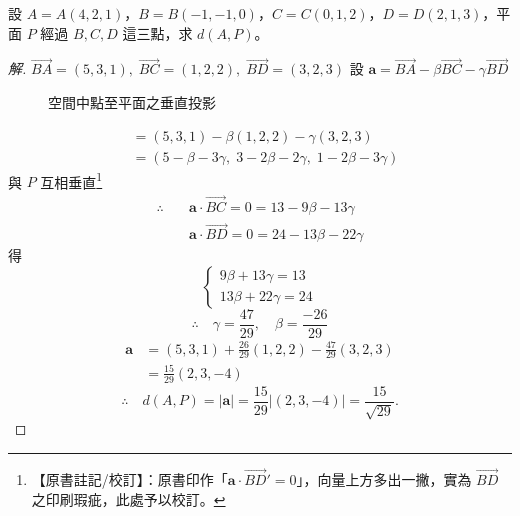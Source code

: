 \begin{example}[例 3]
設 $A = A(4, 2, 1)$，$B = B(-1, -1, 0)$，$C = C(0, 1, 2)$，$D = D(2, 1, 3)$，平面 $P$ 經過 $B, C, D$ 這三點，求 $d(A, P)$。
\end{example}
\begin{proof}[解]
$\vec{BA} = (5, 3, 1),\; \vec{BC} = (1, 2, 2),\; \vec{BD} = (3, 2, 3)$
設 $\mathbf{a} = \vec{BA} - \beta \vec{BC} - \gamma \vec{BD}$

\begin{figure}[H]
\centering
{}
\caption{空間中點至平面之垂直投影}
\label{fig:5-10}
\end{figure}

\begin{align*}
&= (5, 3, 1) - \beta(1, 2, 2) - \gamma(3, 2, 3) \\
&= (5 - \beta - 3\gamma,\; 3 - 2\beta - 2\gamma,\; 1 - 2\beta - 3\gamma)
\end{align*}
與 $P$ 互相垂直\label{note:b3-ch5-p236-bd-prime}\footnote{【原書註記/校訂】：原書印作「$\mathbf{a} \cdot \vec{BD}' = 0$」，向量上方多出一撇，實為 $\vec{BD}$ 之印刷瑕疵，此處予以校訂。}
\begin{align*}
\therefore\quad &\mathbf{a} \cdot \vec{BC} = 0 = 13 - 9\beta - 13\gamma \\
&\mathbf{a} \cdot \vec{BD} = 0 = 24 - 13\beta - 22\gamma
\end{align*}
得
\[ \begin{cases} 9\beta + 13\gamma = 13 \\ 13\beta + 22\gamma = 24 \end{cases} \]
\[ \therefore\quad \gamma = \frac{47}{29},\quad \beta = \frac{-26}{29} \]
\begin{align*}
\mathbf{a} &= (5, 3, 1) + \frac{26}{29}(1, 2, 2) - \frac{47}{29}(3, 2, 3) \\
&= \frac{15}{29}(2, 3, -4)
\end{align*}
\[ \therefore\quad d(A, P) = |\mathbf{a}| = \frac{15}{29} |(2, 3, -4)| = \frac{15}{\sqrt{29}}. \]
\end{proof}

